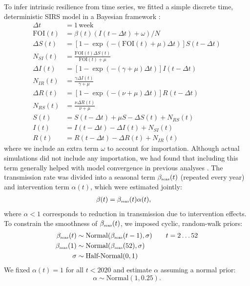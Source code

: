 \documentclass[12pt]{article}
\newcommand{\tsub}[2]{#1_{{\textrm{\tiny #2}}}}
\begin{document}
To infer intrinsic resilience from time series, we fitted a simple discrete time, deterministic SIRS model in a Bayesian framework \citep{park2024predicting}:
\begin{align}
\Delta t &= 1\,\mathrm{week}\\
\textrm{FOI}(t) &= \beta(t) (I(t- \Delta t)+\omega)/N\\
\Delta S(t) &= \left[1- \exp(-(\textrm{FOI}(t) + \mu) \Delta t )\right] S(t-\Delta t)\\
N_{SI}(t) &= \frac{\textrm{FOI}(t)\Delta S(t)}{\textrm{FOI}(t) + \mu} \\
\Delta I(t) &= \left[1- \exp(-(\gamma + \mu) \Delta t )\right] I(t-\Delta t)\\
N_{IR}(t) &= \frac{\gamma \Delta I(t)}{\gamma + \mu} \\
\Delta R(t) &= \left[1- \exp(-(\nu + \mu) \Delta t )\right] R(t-\Delta t)\\
N_{RS}(t) &= \frac{\nu \Delta R(t)}{\nu + \mu} \\
S(t) &= S(t-\Delta t) + \mu S - \Delta S(t) + N_{RS}(t)  \\
I(t) &= I(t-\Delta t) - \Delta I(t) + N_{SI}(t)  \\
R(t) &= R(t-\Delta t) - \Delta R(t) + N_{IR}(t)
\end{align}
where we include an extra term $\omega$ to account for importation.
Although actual simulations did not include any importation, we had found that including this term generally helped with model convergence in previous analyses \citep{park2024predicting}.
The transmission rate was divided into a seasonal term $\tsub{\beta}{seas}(t)$ (repeated every year) and intervention term $\alpha(t)$, which were estimated jointly:
\begin{align}
\beta(t) &= \tsub{\beta}{seas}(t) \alpha(t),
\end{align}
where $\alpha < 1$ corresponds to reduction in transmission due to intervention effects.
To constrain the smoothness of $\tsub{\beta}{seas}(t)$, we imposed cyclic, random-walk priors:
\begin{align}
\tsub{\beta}{seas}(t) &\sim \mathrm{Normal}(\tsub{\beta}{seas}(t-1), \sigma) \qquad t = 2 \dots 52\\
\tsub{\beta}{seas}(1) &\sim \mathrm{Normal}(\tsub{\beta}{seas}(52), \sigma)\\
\sigma &\sim \textrm{Half-Normal}(0, 1)
\end{align}
We fixed $\alpha(t)=1$ for all $t < 2020$ and estimate $\alpha$ assuming a normal prior:
\begin{equation}
\alpha \sim \mathrm{Normal}(1, 0.25).
\end{equation}
\end{document}
